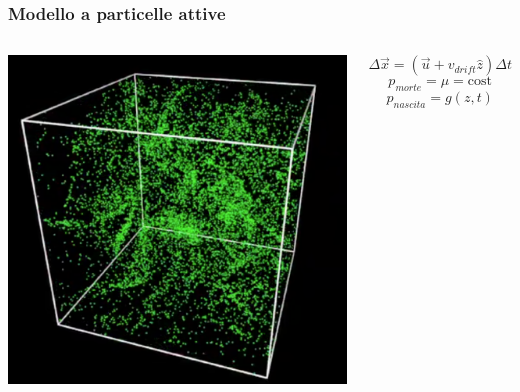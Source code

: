 \begin{frame}
  \frametitle{Modello a particelle attive}
\begin{columns}
\includegraphics[width=\textwidth]{../img/sim_plnk_to}


  \[ \Delta \vec{x} = \left( \vec{u} + v_{drift}\hat{z} \right) \Delta t \]
  \[ p_{morte} = \mu = \mathrm{cost} \]
  \[ p_{nascita} = g(z,t) \]


\end{columns}
\end{frame}
